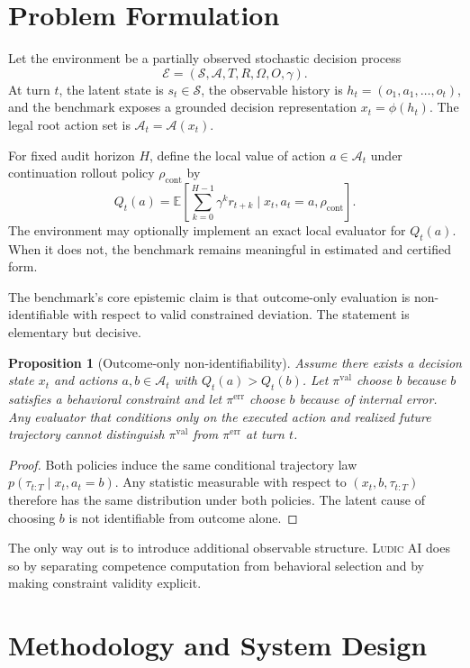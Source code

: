 \documentclass[10pt]{article}
\newtheorem{proposition}{Proposition}
\newcommand{\E}{\mathbb{E}}
\newcommand{\Aset}{\mathcal{A}}
\newcommand{\Sset}{\mathcal{S}}
\newcommand{\Oset}{\Omega}
\newcommand{\Env}{\mathcal{E}}
\newcommand{\ludic}{\textsc{Ludic AI}}
\begin{document}
\section{Problem Formulation}
Let the environment be a partially observed stochastic decision process
$$
\Env = (\Sset, \Aset, T, R, \Oset, O, \gamma).
$$
At turn $t$, the latent state is $s_t \in \Sset$, the observable history is $h_t = (o_1,a_1,\ldots,o_t)$, and the benchmark exposes a grounded decision representation $x_t = \phi(h_t)$. The legal root action set is $\Aset_t = \Aset(x_t)$.

For fixed audit horizon $H$, define the local value of action $a \in \Aset_t$ under continuation rollout policy $\rho_{\mathrm{cont}}$ by
$$
Q_t(a) = \E\!\left[\sum_{k=0}^{H-1} \gamma^k r_{t+k} \mid x_t, a_t = a, \rho_{\mathrm{cont}}\right].
$$
The environment may optionally implement an exact local evaluator for $Q_t(a)$. When it does not, the benchmark remains meaningful in estimated and certified form.

The benchmark's core epistemic claim is that outcome-only evaluation is non-identifiable with respect to valid constrained deviation. The statement is elementary but decisive.

\begin{proposition}[Outcome-only non-identifiability]
Assume there exists a decision state $x_t$ and actions $a,b \in \Aset_t$ with $Q_t(a) > Q_t(b)$. Let $\pi^{\mathrm{val}}$ choose $b$ because $b$ satisfies a behavioral constraint and let $\pi^{\mathrm{err}}$ choose $b$ because of internal error. Any evaluator that conditions only on the executed action and realized future trajectory cannot distinguish $\pi^{\mathrm{val}}$ from $\pi^{\mathrm{err}}$ at turn $t$.
\end{proposition}

\begin{proof}
Both policies induce the same conditional trajectory law $p(\tau_{t:T} \mid x_t, a_t = b)$. Any statistic measurable with respect to $(x_t,b,\tau_{t:T})$ therefore has the same distribution under both policies. The latent cause of choosing $b$ is not identifiable from outcome alone.
\end{proof}

The only way out is to introduce additional observable structure. \ludic{} does so by separating competence computation from behavioral selection and by making constraint validity explicit.

\section{Methodology and System Design}
\end{document}
